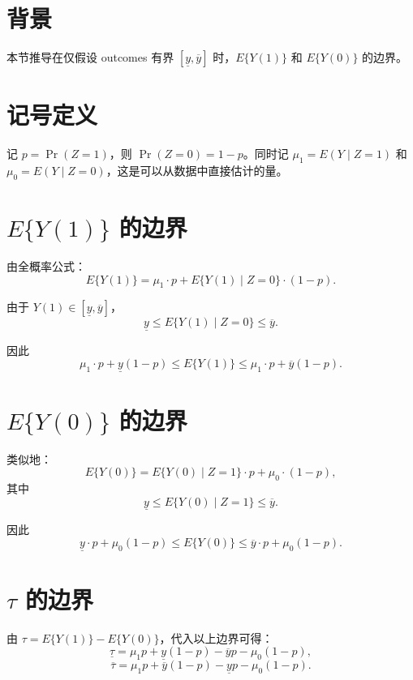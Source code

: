 \section{背景}\label{sec:appendix-18-manski-bg}

本节推导在仅假设 outcomes 有界 $[\underline{y}, \overline{y}]$ 时，$E\{Y(1)\}$ 和 $E\{Y(0)\}$ 的边界。

\section{记号定义}\label{sec:appendix-18-manski-notation}

记 $p = \Pr(Z=1)$，则 $\Pr(Z=0) = 1-p$。同时记 $\mu_1 = E(Y \mid Z=1)$ 和 $\mu_0 = E(Y \mid Z=0)$，这是可以从数据中直接估计的量。

\section{$E\{Y(1)\}$ 的边界}\label{sec:appendix-18-y1-bounds}

由全概率公式：
\[
E\{Y(1)\} = \mu_1 \cdot p + E\{Y(1) \mid Z=0\} \cdot (1-p) .
\]

由于 $Y(1) \in [\underline{y}, \overline{y}]$，
\[
\underline{y} \leq E\{Y(1) \mid Z=0\} \leq \overline{y} .
\]

因此
\[
\mu_1 \cdot p + \underline{y}(1-p) \leq E\{Y(1)\} \leq \mu_1 \cdot p + \overline{y}(1-p) .
\]

\section{$E\{Y(0)\}$ 的边界}\label{sec:appendix-18-y0-bounds}

类似地：
\[
E\{Y(0)\} = E\{Y(0) \mid Z=1\} \cdot p + \mu_0 \cdot (1-p) ,
\]
其中
\[
\underline{y} \leq E\{Y(0) \mid Z=1\} \leq \overline{y} .
\]

因此
\[
\underline{y} \cdot p + \mu_0(1-p) \leq E\{Y(0)\} \leq \overline{y} \cdot p + \mu_0(1-p) .
\]

\section{$\tau$ 的边界}\label{sec:appendix-18-tau-bounds}

由 $\tau = E\{Y(1)\} - E\{Y(0)\}$，代入以上边界可得：
\[
\underline{\tau} = \mu_1 p + \underline{y}(1-p) - \overline{y} p - \mu_0(1-p) ,
\]
\[
\overline{\tau} = \mu_1 p + \overline{y}(1-p) - \underline{y} p - \mu_0(1-p) .
\]


